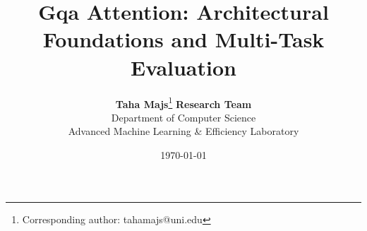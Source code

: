 \title{\textbf{Gqa Attention: Architectural Foundations and Multi-Task Evaluation}}

\author{
  \textbf{Taha Majs}\thanks{Corresponding author: tahamajs@uni.edu} \quad \textbf{Research Team} \\
  Department of Computer Science \\
  Advanced Machine Learning \& Efficiency Laboratory
}

\date{\today}
